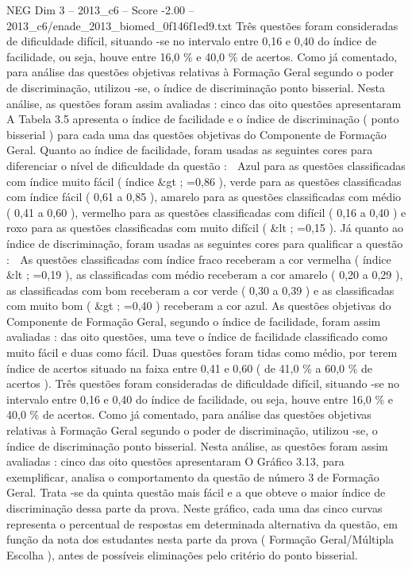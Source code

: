 \begin{textsample}{NEG Dim 3 – 2013\_c6 – Score -2.00 – 2013\_c6/enade\_2013\_biomed\_0f146f1ed9.txt}
Três questões foram consideradas de dificuldade difícil, situando -se no intervalo entre 0,16 e 0,40 do índice de facilidade, ou seja, houve entre 16,0 \% e 40,0 \% de acertos.
Como já comentado, para análise das questões objetivas relativas à Formação Geral segundo o poder de discriminação, utilizou -se, o índice de discriminação ponto bisserial.
Nesta análise, as questões foram assim avaliadas : cinco das oito questões apresentaram A Tabela 3.5 apresenta o índice de facilidade e o índice de discriminação ( ponto bisserial ) para cada uma das questões objetivas do Componente de Formação Geral.
Quanto ao índice de facilidade, foram usadas as seguintes cores para diferenciar o nível de dificuldade da questão :  Azul para as questões classificadas com índice muito fácil ( índice \&gt ; =0,86 ), verde para as questões classificadas com índice fácil ( 0,61 a 0,85 ), amarelo para as questões classificadas com médio ( 0,41 a 0,60 ), vermelho para as questões classificadas com difícil ( 0,16 a 0,40 ) e roxo para as questões classificadas com muito difícil ( \&lt ; =0,15 ).
Já quanto ao índice de discriminação, foram usadas as seguintes cores para qualificar a questão :  As questões classificadas com índice fraco receberam a cor vermelha ( índice \&lt ; =0,19 ), as classificadas com médio receberam a cor amarelo ( 0,20 a 0,29 ), as classificadas com bom receberam a cor verde ( 0,30 a 0,39 ) e as classificadas com muito bom ( \&gt ; =0,40 ) receberam a cor azul.
As questões objetivas do Componente de Formação Geral, segundo o índice de facilidade, foram assim avaliadas : das oito questões, uma teve o índice de facilidade classificado como muito fácil e duas como fácil.
Duas questões foram tidas como médio, por terem índice de acertos situado na faixa entre 0,41 e 0,60 ( de 41,0 \% a 60,0 \% de acertos ).
Três questões foram consideradas de dificuldade difícil, situando -se no intervalo entre 0,16 e 0,40 do índice de facilidade, ou seja, houve entre 16,0 \% e 40,0 \% de acertos.
Como já comentado, para análise das questões objetivas relativas à Formação Geral segundo o poder de discriminação, utilizou -se, o índice de discriminação ponto bisserial.
Nesta análise, as questões foram assim avaliadas : cinco das oito questões apresentaram O Gráfico 3.13, para exemplificar, analisa o comportamento da questão de número 3 de Formação Geral.
Trata -se da quinta questão mais fácil e a que obteve o maior índice de discriminação dessa parte da prova.
Neste gráfico, cada uma das cinco curvas representa o percentual de respostas em determinada alternativa da questão, em função da nota dos estudantes nesta parte da prova ( Formação Geral/Múltipla Escolha ), antes de possíveis eliminações pelo critério do ponto bisserial.

\end{textsample}
